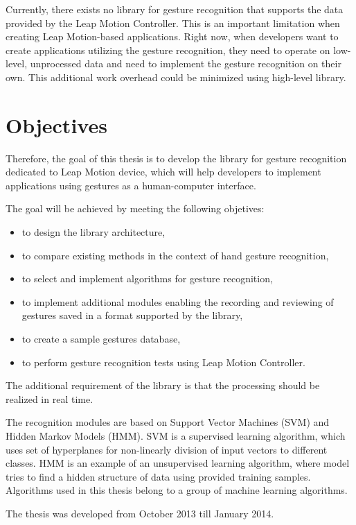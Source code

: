 Currently, there exists no library for gesture recognition that supports the data provided by the Leap Motion Controller.
This is an important limitation when creating Leap Motion-based applications.
Right now, when developers want to create applications utilizing the gesture recognition, they need to operate on low-level, unprocessed data and need to implement the gesture recognition on their own.
This additional work overhead could be minimized using high-level library.

\section{Objectives}

Therefore, the goal of this thesis is to develop the library for gesture recognition dedicated to Leap Motion device, which will help developers to implement applications using gestures as a human-computer interface.

The goal will be achieved by meeting the following objetives:
\begin{itemize}
\item to design the library architecture, 
\item to compare existing methods in the context of hand gesture recognition,
\item to select and implement algorithms for gesture recognition,
\item to implement additional modules enabling the recording and reviewing of gestures saved in a format supported by the library,
\item to create a sample gestures database,
\item to perform gesture recognition tests using Leap Motion Controller.
\end{itemize}
The additional requirement of the library is that the processing should be realized in real time.


The recognition modules are based on Support Vector Machines (SVM) and Hidden Markov Models (HMM). 
SVM is a supervised learning algorithm, which uses set of hyperplanes for non-linearly division of input vectors to different classes. 
HMM is an example of an unsupervised learning algorithm, where model tries to find a hidden structure of data using provided training samples. 
Algorithms used in this thesis belong to a group of machine learning algorithms.

The thesis was developed from October 2013 till January 2014.


